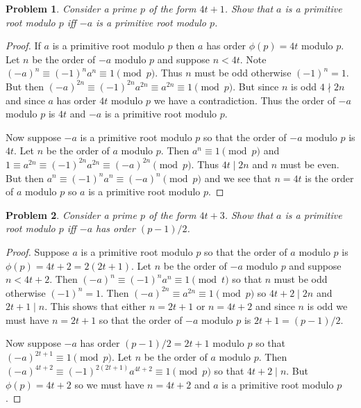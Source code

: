 \documentclass{article}
\newtheorem{problem}{Problem}
\begin{document}
\begin{problem}
\label{even}
Consider a prime $p$ of the form $4t + 1$. Show that $a$ is a primitive root modulo $p$ iff $-a$ is a primitive root modulo $p$.
\end{problem}
\begin{proof}
If $a$ is a primitive root modulo $p$ then $a$ has order $\phi(p) = 4t$ modulo $p$. Let $n$ be the order of $-a$ modulo $p$ and suppose $n < 4t$. Note $(-a)^n \equiv (-1)^n a^n \equiv 1 \pmod{p}$. Thus $n$ must be odd otherwise $(-1)^n = 1$. But then $(-a)^{2n} \equiv (-1)^{2n} a^{2n} \equiv a^{2n} \equiv 1 \pmod{p}$. But since $n$ is odd $4 \nmid 2n$ and since $a$ has order $4t$ modulo $p$ we have a contradiction. Thus the order of $-a$ modulo $p$ is $4t$ and $-a$ is a primitive root modulo $p$.

Now suppose $-a$ is a primitive root modulo $p$ so that the order of $-a$ modulo $p$ is $4t$. Let $n$ be the order of $a$ modulo $p$. Then $a^n \equiv 1 \pmod{p}$ and $1 \equiv a^{2n} \equiv (-1)^{2n} a^{2n} \equiv (-a)^{2n} \pmod{p}$. Thus $4t \mid 2n$ and $n$ must be even. But then $a^n \equiv (-1)^n a^n \equiv (-a)^n \pmod{p}$ and we see that $n = 4t$ is the order of $a$ modulo $p$ so $a$ is a primitive root modulo $p$.
\end{proof}

\begin{problem}
Consider a prime $p$ of the form $4t + 3$. Show that $a$ is a primitive root modulo $p$ iff $-a$ has order $(p-1)/2$.
\end{problem}
\begin{proof}
Suppose $a$ is a primitive root modulo $p$ so that the order of $a$ modulo $p$ is $\phi(p) = 4t+2 = 2(2t+1)$. Let $n$ be the order of $-a$ modulo $p$ and suppose $n < 4t+2$. Then $(-a)^n \equiv (-1)^n a^n \equiv 1 \pmod{t}$ so that $n$ must be odd otherwise $(-1)^n = 1$. Then $(-a)^{2n} \equiv a^{2n} \equiv 1 \pmod{p}$ so $4t+2 \mid 2n$ and $2t + 1 \mid n$. This shows that either $n = 2t+1$ or $n = 4t+2$ and since $n$ is odd we must have $n = 2t+1$ so that the order of $-a$ modulo $p$ is $2t+1 = (p-1)/2$.

Now suppose $-a$ has order $(p-1)/2 = 2t+1$ modulo $p$ so that $(-a)^{2t+1} \equiv 1 \pmod{p}$. Let $n$ be the order of $a$ modulo $p$. Then $(-a)^{4t+2} \equiv (-1)^{2(2t+1)} a^{4t+2} \equiv 1 \pmod{p}$ so that $4t+2 \mid n$. But $\phi(p) = 4t+2$ so we must have $n = 4t+2$ and $a$ is a primitive root modulo $p$.
\end{proof}
\end{document}

